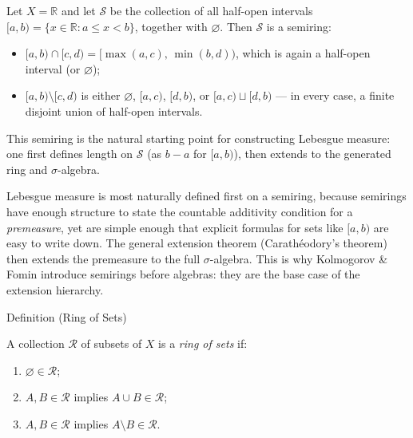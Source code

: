 \begin{example*}
\label{ex:semiring-intervals}
Let $X = \mathbb{R}$ and let $\mathcal{S}$ be the collection of all half-open
intervals $[a, b) = \{x \in \mathbb{R} : a \leq x < b\}$, together with
$\varnothing$. Then $\mathcal{S}$ is a semiring:
\begin{itemize}
\item $[a,b) \cap [c,d) = [\max(a,c),\, \min(b,d))$, which is again a half-open
  interval (or $\varnothing$);
\item $[a,b) \setminus [c,d)$ is either $\varnothing$, $[a,c)$, $[d,b)$, or
  $[a,c) \sqcup [d,b)$ — in every case, a finite disjoint union of half-open
  intervals.
\end{itemize}
This semiring is the natural starting point for constructing Lebesgue measure:
one first defines length on $\mathcal{S}$ (as $b - a$ for $[a,b)$), then
extends to the generated ring and $\sigma$-algebra.
\end{example*}

\begin{remark*}
Lebesgue measure is most naturally defined first on a semiring, because
semirings have enough structure to state the countable additivity condition for
a \emph{premeasure}, yet are simple enough that explicit formulas for sets like
$[a,b)$ are easy to write down. The general extension theorem (Carathéodory's
theorem) then extends the premeasure to the full $\sigma$-algebra. This is why
Kolmogorov \& Fomin introduce semirings before algebras: they are the base
case of the extension hierarchy.
\end{remark*}


\begin{definitionbox}{Definition (Ring of Sets)}
\begin{definition}\label{def:ring-of-sets}
A collection $\mathcal{R}$ of subsets of $X$ is a \emph{ring of sets} if:
\begin{enumerate}[label=(\roman*)]
\item $\varnothing \in \mathcal{R}$;
\item $A, B \in \mathcal{R}$ implies $A \cup B \in \mathcal{R}$;
\item $A, B \in \mathcal{R}$ implies $A \setminus B \in \mathcal{R}$.
\end{enumerate}
\end{definition}
\end{definitionbox}

